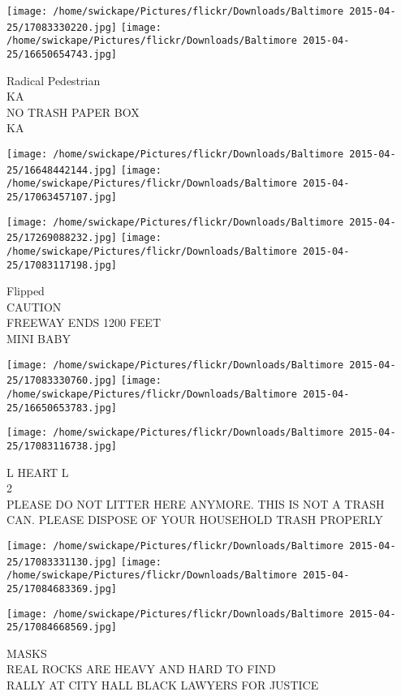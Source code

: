 \documentclass[10pt,letterpaper]{article}
\begin{document}
\texttt{[image: /home/swickape/Pictures/flickr/Downloads/Baltimore 2015-04-25/17083330220.jpg]}
\texttt{[image: /home/swickape/Pictures/flickr/Downloads/Baltimore 2015-04-25/16650654743.jpg]}

Radical Pedestrian\\
KA\\
NO TRASH PAPER BOX\\
KA
\pagebreak

\texttt{[image: /home/swickape/Pictures/flickr/Downloads/Baltimore 2015-04-25/16648442144.jpg]}
\texttt{[image: /home/swickape/Pictures/flickr/Downloads/Baltimore 2015-04-25/17063457107.jpg]}

\texttt{[image: /home/swickape/Pictures/flickr/Downloads/Baltimore 2015-04-25/17269088232.jpg]}
\texttt{[image: /home/swickape/Pictures/flickr/Downloads/Baltimore 2015-04-25/17083117198.jpg]}

Flipped\\
CAUTION\\
FREEWAY ENDS 1200 FEET\\
MINI BABY
\pagebreak

\texttt{[image: /home/swickape/Pictures/flickr/Downloads/Baltimore 2015-04-25/17083330760.jpg]}
\texttt{[image: /home/swickape/Pictures/flickr/Downloads/Baltimore 2015-04-25/16650653783.jpg]}

\vspace{0.25in}
\texttt{[image: /home/swickape/Pictures/flickr/Downloads/Baltimore 2015-04-25/17083116738.jpg]}

L HEART L\\
2\\
PLEASE DO NOT LITTER HERE ANYMORE.  THIS IS NOT A TRASH CAN.  PLEASE DISPOSE OF YOUR HOUSEHOLD TRASH PROPERLY
\pagebreak

\texttt{[image: /home/swickape/Pictures/flickr/Downloads/Baltimore 2015-04-25/17083331130.jpg]}
\texttt{[image: /home/swickape/Pictures/flickr/Downloads/Baltimore 2015-04-25/17084683369.jpg]}

\vspace{0.25in}
\texttt{[image: /home/swickape/Pictures/flickr/Downloads/Baltimore 2015-04-25/17084668569.jpg]}

MASKS\\
REAL ROCKS ARE HEAVY AND HARD TO FIND\\
RALLY AT CITY HALL BLACK LAWYERS FOR JUSTICE
\pagebreak
\end{document}
